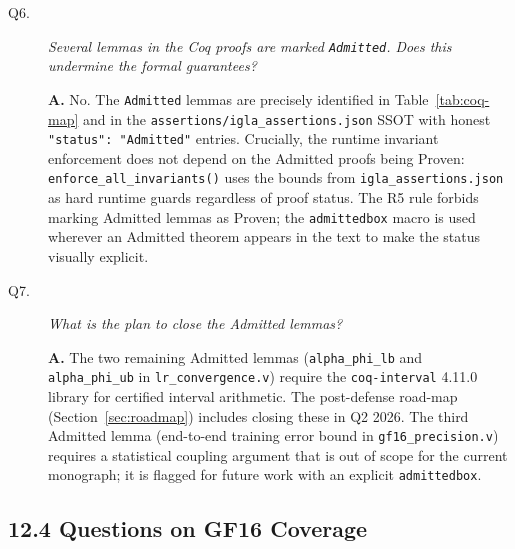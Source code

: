 \begin{description}
\item[Q6.] \emph{Several lemmas in the Coq proofs are marked
  \texttt{Admitted}.  Does this undermine the formal guarantees?}

  \textbf{A.}  No.  The \texttt{Admitted} lemmas are precisely
  identified in Table~\ref{tab:coq-map} and in the
  \texttt{assertions/igla\_assertions.json} SSOT with honest
  \texttt{"status": "Admitted"} entries.  Crucially, the runtime
  invariant enforcement does not depend on the Admitted proofs being
  Proven: \texttt{enforce\_all\_invariants()} uses the bounds from
  \texttt{igla\_assertions.json} as hard runtime guards regardless of
  proof status.  The R5 rule forbids marking Admitted lemmas as Proven;
  the \texttt{admittedbox} macro is used wherever an Admitted theorem
  appears in the text to make the status visually explicit.

\item[Q7.] \emph{What is the plan to close the Admitted lemmas?}

  \textbf{A.}  The two remaining Admitted lemmas (\texttt{alpha\_phi\_lb}
  and \texttt{alpha\_phi\_ub} in \texttt{lr\_convergence.v}) require the
  \texttt{coq-interval} 4.11.0 library for certified interval arithmetic.
  The post-defense road-map (Section~\ref{sec:roadmap}) includes closing
  these in Q2 2026.  The third Admitted lemma (end-to-end training error
  bound in \texttt{gf16\_precision.v}) requires a statistical coupling
  argument that is out of scope for the current monograph; it is flagged
  for future work with an explicit \texttt{admittedbox}.
\end{description}

\subsection{12.4 Questions on GF16 Coverage}\label{sec:qa-gf16}

